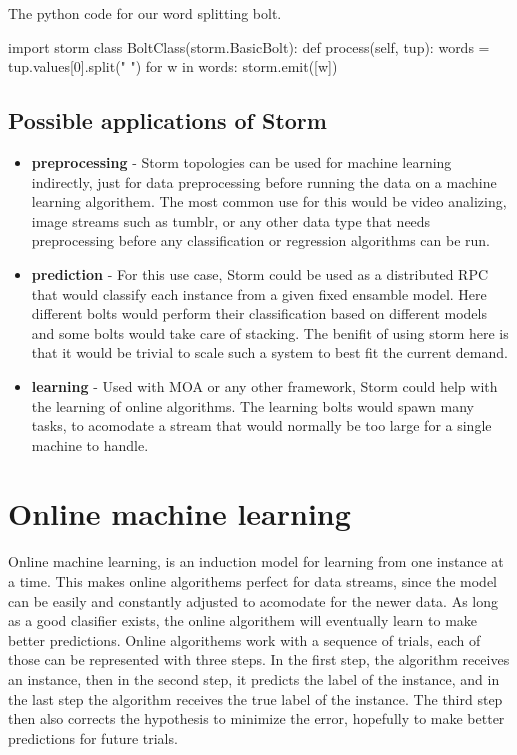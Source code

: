 \documentclass[journal]{IEEEtran/IEEEtran}
\begin{document}
The python code for our word splitting bolt.

\begin{code}

import storm
class BoltClass(storm.BasicBolt):
    def process(self, tup):
        words = tup.values[0].split(" ")
        for w in words:
            storm.emit([w])

\end{code}


\subsection{Possible applications of Storm}


\begin{itemize}
    \item \textbf{preprocessing} - Storm topologies can be used for machine learning indirectly, just for data preprocessing before running the data on a machine learning algorithem. The most common use for this would be video analizing, image streams such as tumblr, or any other data type that needs preprocessing before any classification or regression algorithms can be run.\\

    \item \textbf{prediction} - For this use case, Storm could be used as a distributed RPC that would classify each instance from a given fixed ensamble model. Here different bolts would perform their classification based on different models and some bolts would take care of stacking. The benifit of using storm here is that it would be trivial to scale such a system to best fit the current demand. 
\\
    \item \textbf{learning} - Used with MOA or any other framework, Storm could help with the learning of online algorithms. The learning bolts would spawn many tasks, to acomodate a stream that would normally be too large for a single machine to handle.\\
\end{itemize}


\section{Online machine learning}

Online machine learning, is an induction model for learning from one instance at a time. This makes online algorithems perfect for data streams, since the model can be easily and constantly adjusted to acomodate for the newer data. As long as a good clasifier exists, the online algorithem will eventually learn to make better predictions. Online algorithems work with a sequence of trials, each of those can be represented with three steps. In the first step, the algorithm receives an instance, then in the second step, it predicts the label of the instance, and in the last step the algorithm receives the true label of the instance. The third step then also corrects the hypothesis to minimize the error, hopefully to make better predictions for future trials. \\
\end{document}
